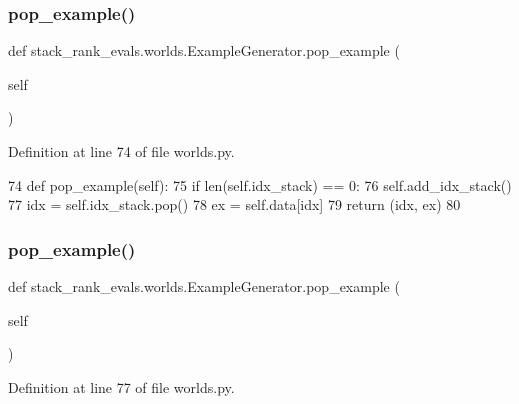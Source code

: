\subsubsection{\texorpdfstring{pop\+\_\+example()}{pop\_example()}\hspace{0.1cm}{\footnotesize\ttfamily [1/2]}}
{\footnotesize\ttfamily def stack\+\_\+rank\+\_\+evals.\+worlds.\+Example\+Generator.\+pop\+\_\+example (\begin{DoxyParamCaption}\item[{}]{self }\end{DoxyParamCaption})}



Definition at line 74 of file worlds.\+py.


\begin{DoxyCode}
74     \textcolor{keyword}{def }pop\_example(self):
75         \textcolor{keywordflow}{if} len(self.idx\_stack) == 0:
76             self.add\_idx\_stack()
77         idx = self.idx\_stack.pop()
78         ex = self.data[idx]
79         \textcolor{keywordflow}{return} (idx, ex)
80 
\end{DoxyCode}
\mbox{\label{classstack__rank__evals_1_1worlds_1_1ExampleGenerator_ae50d35087dd679c73aa8f5354845199f}} 
\subsubsection{\texorpdfstring{pop\+\_\+example()}{pop\_example()}\hspace{0.1cm}{\footnotesize\ttfamily [2/2]}}
{\footnotesize\ttfamily def stack\+\_\+rank\+\_\+evals.\+worlds.\+Example\+Generator.\+pop\+\_\+example (\begin{DoxyParamCaption}\item[{}]{self }\end{DoxyParamCaption})}



Definition at line 77 of file worlds.\+py.


